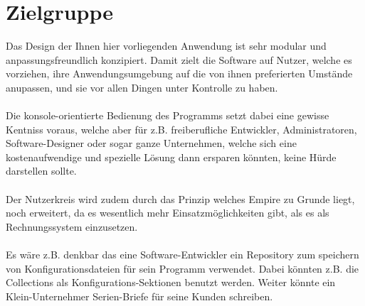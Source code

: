 
\section{Zielgruppe}

Das Design der Ihnen hier vorliegenden Anwendung ist sehr modular und anpassungsfreundlich konzipiert. Damit zielt die Software auf Nutzer, welche
es vorziehen, ihre Anwendungsumgebung auf die von ihnen preferierten Umstände anupassen, und sie vor allen Dingen unter Kontrolle zu haben.
\\\\
Die konsole-orientierte Bedienung des Programms setzt dabei eine gewisse Kentniss voraus, welche aber für z.B. freiberufliche Entwickler, Administratoren,
Software-Designer oder sogar ganze Unternehmen, welche sich eine kostenaufwendige und spezielle Lösung dann ersparen könnten, keine Hürde darstellen sollte.
\\\\
Der Nutzerkreis wird zudem durch das Prinzip welches Empire zu Grunde liegt, noch erweitert, da es wesentlich mehr Einsatzmöglichkeiten gibt, als es als Rechnungssystem
einzusetzen.
\\\\
Es wäre z.B. denkbar das eine Software-Entwickler ein Repository zum speichern von Konfigurationsdateien für sein Programm verwendet.
Dabei könnten z.B. die Collections als Konfigurations-Sektionen benutzt werden. Weiter könnte ein Klein-Unternehmer Serien-Briefe für seine Kunden schreiben.

%
%
